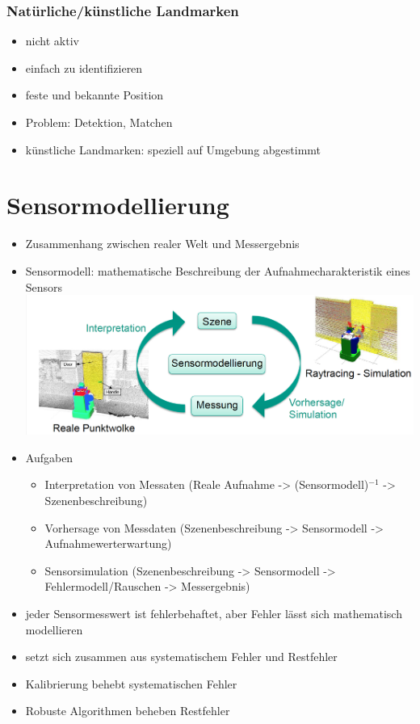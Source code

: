 \documentclass[paper=a4, fontsize=11pt]{scrartcl} %
\numberwithin{equation}{section} %
\numberwithin{figure}{section} %
\numberwithin{table}{section} %
\begin{document}
\subsubsection{Natürliche/künstliche Landmarken}

\begin{itemize}
\item nicht aktiv
\item einfach zu identifizieren
\item feste und bekannte Position
\item Problem: Detektion, Matchen
\item künstliche Landmarken: speziell auf Umgebung abgestimmt
\end{itemize}

\section{Sensormodellierung}

\begin{itemize}
\item Zusammenhang zwischen realer Welt und Messergebnis
\item Sensormodell: mathematische Beschreibung der Aufnahmecharakteristik eines Sensors\\ 
\includegraphics[width=\textwidth]{imgs/sensormodellierung}
\item Aufgaben
\begin{itemize}
\item Interpretation von Messaten (Reale Aufnahme -> (Sensormodell)$^{-1}$ -> Szenenbeschreibung)
\item Vorhersage von Messdaten (Szenenbeschreibung -> Sensormodell -> Aufnahmewerterwartung)
\item Sensorsimulation (Szenenbeschreibung -> Sensormodell -> Fehlermodell/Rauschen -> Messergebnis)
\end{itemize}
\item jeder Sensormesswert ist fehlerbehaftet, aber Fehler lässt sich mathematisch modellieren
\item setzt sich zusammen aus systematischem Fehler und Restfehler
\item Kalibrierung behebt systematischen Fehler
\item Robuste Algorithmen beheben Restfehler
\end{itemize}
\end{document}
